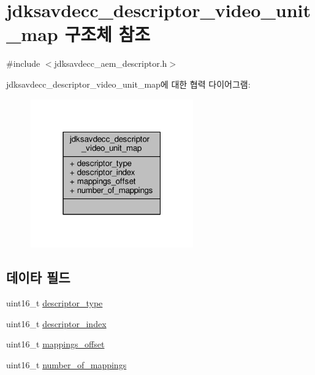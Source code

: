 \hypertarget{structjdksavdecc__descriptor__video__unit__map}{}\section{jdksavdecc\+\_\+descriptor\+\_\+video\+\_\+unit\+\_\+map 구조체 참조}
\label{structjdksavdecc__descriptor__video__unit__map}


{\ttfamily \#include $<$jdksavdecc\+\_\+aem\+\_\+descriptor.\+h$>$}



jdksavdecc\+\_\+descriptor\+\_\+video\+\_\+unit\+\_\+map에 대한 협력 다이어그램\+:
\nopagebreak
\begin{figure}[H]
\begin{center}
\leavevmode
\includegraphics[width=199pt]{structjdksavdecc__descriptor__video__unit__map__coll__graph}
\end{center}
\end{figure}
\subsection*{데이타 필드}
\begin{DoxyCompactItemize}
\item 
uint16\+\_\+t \hyperlink{structjdksavdecc__descriptor__video__unit__map_ab7c32b6c7131c13d4ea3b7ee2f09b78d}{descriptor\+\_\+type}
\item 
uint16\+\_\+t \hyperlink{structjdksavdecc__descriptor__video__unit__map_a042bbc76d835b82d27c1932431ee38d4}{descriptor\+\_\+index}
\item 
uint16\+\_\+t \hyperlink{structjdksavdecc__descriptor__video__unit__map_ac91a41273e32c7bf86ca390838721642}{mappings\+\_\+offset}
\item 
uint16\+\_\+t \hyperlink{structjdksavdecc__descriptor__video__unit__map_ac7db472c5622ef473d5d0a5c416d5531}{number\+\_\+of\+\_\+mappings}
\end{DoxyCompactItemize}


